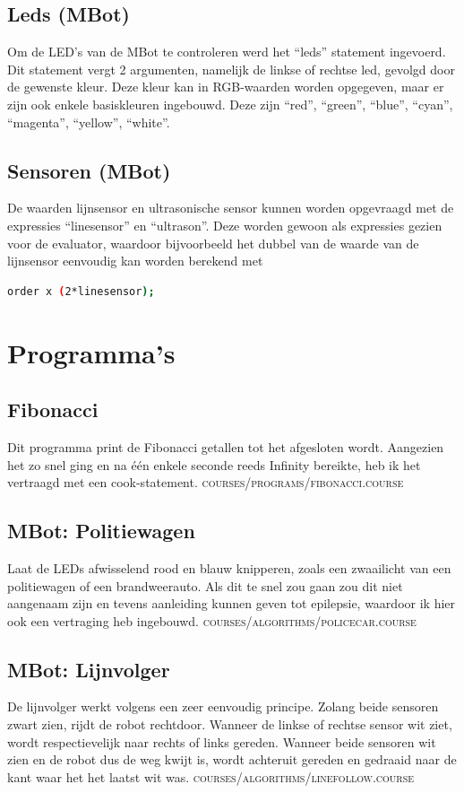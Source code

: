 \documentclass[12pt,a4paper]{report}
\begin{document}
\section{Leds (MBot)}
Om de LED's van de MBot te controleren werd het ``leds'' statement ingevoerd. Dit statement vergt 2 argumenten, namelijk de linkse of rechtse led, gevolgd door de gewenste kleur. Deze kleur kan in RGB-waarden worden opgegeven, maar er zijn ook enkele basiskleuren ingebouwd. Deze zijn ``red'', ``green'', ``blue'', ``cyan'', ``magenta'', ``yellow'', ``white''.

\section{Sensoren (MBot)}
De waarden lijnsensor en ultrasonische sensor kunnen worden opgevraagd met de expressies ``linesensor'' en ``ultrason''. Deze worden gewoon als expressies gezien voor de evaluator, waardoor bijvoorbeeld het dubbel van de waarde van de lijnsensor eenvoudig kan worden berekend met
\begin{lstlisting}[language=Bash]
  order x (2*linesensor);
\end{lstlisting}

\chapter{Programma's}

\section{Fibonacci}
Dit programma print de Fibonacci getallen tot het afgesloten wordt. Aangezien het zo snel ging en na één enkele seconde reeds Infinity bereikte, heb ik het vertraagd met een cook-statement. \textsc{courses/programs/fibonacci.course}

\section{MBot: Politiewagen}
Laat de LEDs afwisselend rood en blauw knipperen, zoals een zwaailicht van een politiewagen of een brandweerauto. Als dit te snel zou gaan zou dit niet aangenaam zijn en tevens aanleiding kunnen geven tot epilepsie, waardoor ik hier ook een vertraging heb ingebouwd. \textsc{courses/algorithms/policecar.course}

\section{MBot: Lijnvolger}
De lijnvolger werkt volgens een zeer eenvoudig principe. Zolang beide sensoren zwart zien, rijdt de robot rechtdoor. Wanneer de linkse of rechtse sensor wit ziet, wordt respectievelijk naar rechts of links gereden. Wanneer beide sensoren wit zien en de robot dus de weg kwijt is, wordt achteruit gereden en gedraaid naar de kant waar het het laatst wit was. \textsc{courses/algorithms/linefollow.course}

\end{document}
